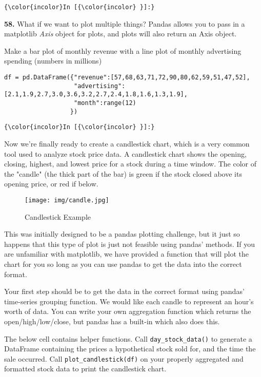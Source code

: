\documentclass[11pt]{article}
\makeatletter
\def\maxwidth{\ifdim\Gin@nat@width>\linewidth\linewidth
    \else\Gin@nat@width\fi}
\let\Oldincludegraphics\includegraphics
\renewcommand{\includegraphics}[1]{\Oldincludegraphics[width=.8\maxwidth]{#1}}
\makeatother
\begin{document}
    \begin{Verbatim}[commandchars=\\\{\}]
{\color{incolor}In [{\color{incolor} }]:} 
\end{Verbatim}


    \textbf{58.} What if we want to plot multiple things? Pandas allows you
to pass in a matplotlib \emph{Axis} object for plots, and plots will
also return an Axis object.

Make a bar plot of monthly revenue with a line plot of monthly
advertising spending (numbers in millions)

\begin{verbatim}
df = pd.DataFrame({"revenue":[57,68,63,71,72,90,80,62,59,51,47,52],
                   "advertising":[2.1,1.9,2.7,3.0,3.6,3.2,2.7,2.4,1.8,1.6,1.3,1.9],
                   "month":range(12)
                  })
\end{verbatim}

    \begin{Verbatim}[commandchars=\\\{\}]
{\color{incolor}In [{\color{incolor} }]:} 
\end{Verbatim}


    Now we're finally ready to create a candlestick chart, which is a very
common tool used to analyze stock price data. A candlestick chart shows
the opening, closing, highest, and lowest price for a stock during a
time window. The color of the "candle" (the thick part of the bar) is
green if the stock closed above its opening price, or red if below.

\begin{figure}
\centering
\texttt{[image: img/candle.jpg]}
\caption{Candlestick Example}
\end{figure}

This was initially designed to be a pandas plotting challenge, but it
just so happens that this type of plot is just not feasible using
pandas' methods. If you are unfamiliar with matplotlib, we have provided
a function that will plot the chart for you so long as you can use
pandas to get the data into the correct format.

Your first step should be to get the data in the correct format using
pandas' time-series grouping function. We would like each candle to
represent an hour's worth of data. You can write your own aggregation
function which returns the open/high/low/close, but pandas has a
built-in which also does this.

    The below cell contains helper functions. Call
\texttt{day\_stock\_data()} to generate a DataFrame containing the
prices a hypothetical stock sold for, and the time the sale occurred.
Call \texttt{plot\_candlestick(df)} on your properly aggregated and
formatted stock data to print the candlestick chart.
\end{document}
